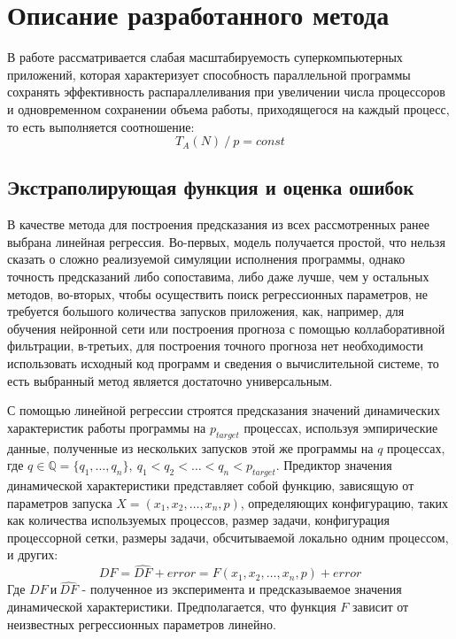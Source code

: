 \section{Описание разработанного метода}
	В работе рассматривается слабая масштабируемость суперкомпьютерных приложений, которая характеризует способность параллельной программы сохранять эффективность распараллеливания при увеличении числа процессоров и одновременном сохранении объема работы, приходящегося на каждый процесс, то есть выполняется соотношение:
	\begin{equation}\label{weak_sc}
	T_A(N)\:/\:p = const
	\end{equation}

	\subsection{Экстраполирующая функция и оценка ошибок}
		В качестве метода для построения предсказания из всех рассмотренных ранее выбрана линейная регрессия. Во-первых, модель получается простой, что нельзя сказать о сложно реализуемой симуляции исполнения программы, однако точность предсказаний либо сопоставима, либо даже лучше, чем у остальных методов, во-вторых, чтобы осуществить поиск регрессионных параметров, не требуется большого количества запусков приложения, как, например, для обучения нейронной сети или построения прогноза с помощью коллаборативной фильтрации, в-третьих, для построения точного прогноза нет необходимости использовать исходный код программ и сведения о вычислительной системе, то есть выбранный метод является достаточно универсальным.%

		С помощью линейной регрессии строятся предсказания значений динамических характеристик работы программы на \(p_{target}\) процессах, используя эмпирические данные, полученные из нескольких запусков этой же программы на \(q\) процессах, где
		\(q \in \mathbb{Q} = \{q_1,\ldots, q_n\},\ q_1 < q_2 < \ldots < q_n < p_{target}\).
		Предиктор значения динамической характеристики представляет собой функцию, зависящую от параметров запуска \(X = (x_1, x_2, \ldots, x_n, p)\), определяющих конфигурацию, таких как количества используемых процессов, размер задачи, конфигурация процессорной сетки, размеры задачи, обсчитываемой локально одним процессом, и других:
		\begin{equation}\label{main_formula}
		DF = \hat{DF} + error = F(x_1, x_2, \ldots, x_n, p) + error
		\end{equation}
		Где \(DF\ и\ \hat{DF}\) - полученное из эксперимента и предсказываемое значения динамической характеристики. Предполагается, что функция \(F\) зависит от неизвестных регрессионных параметров линейно.

